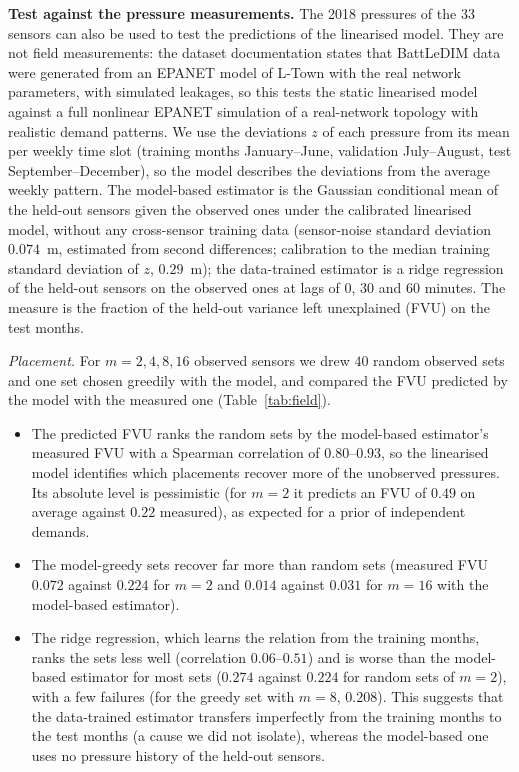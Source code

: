 \documentclass[conference]{IEEEtran}
\begin{document}
\textbf{Test against the pressure measurements.} The 2018 pressures of the 33 sensors can also be used to test the predictions of the linearised model. They are not field measurements: the dataset documentation states that BattLeDIM data were generated from an EPANET model of L-Town with the real network parameters, with simulated leakages, so this tests the static linearised model against a full nonlinear EPANET simulation of a real-network topology with realistic demand patterns. We use the deviations $z$ of each pressure from its mean per weekly time slot (training months January--June, validation July--August, test September--December), so the model describes the deviations from the average weekly pattern. The model-based estimator is the Gaussian conditional mean of the held-out sensors given the observed ones under the calibrated linearised model, without any cross-sensor training data (sensor-noise standard deviation $0.074$~m, estimated from second differences; calibration to the median training standard deviation of $z$, $0.29$~m); the data-trained estimator is a ridge regression of the held-out sensors on the observed ones at lags of $0$, $30$ and $60$ minutes. The measure is the fraction of the held-out variance left unexplained (FVU) on the test months. 

\emph{Placement.} For $m=2,4,8,16$ observed sensors we drew $40$ random observed sets and one set chosen greedily with the model, and compared the FVU predicted by the model with the measured one (Table~\ref{tab:field}).
\begin{itemize}
\item The predicted FVU ranks the random sets by the model-based estimator's measured FVU with a Spearman correlation of $0.80$--$0.93$, so the linearised model identifies which placements recover more of the unobserved pressures. Its absolute level is pessimistic (for $m=2$ it predicts an FVU of $0.49$ on average against $0.22$ measured), as expected for a prior of independent demands.
\item The model-greedy sets recover far more than random sets (measured FVU $0.072$ against $0.224$ for $m=2$ and $0.014$ against $0.031$ for $m=16$ with the model-based estimator).
\item The ridge regression, which learns the relation from the training months, ranks the sets less well (correlation $0.06$--$0.51$) and is worse than the model-based estimator for most sets ($0.274$ against $0.224$ for random sets of $m=2$), with a few failures (for the greedy set with $m=8$, $0.208$). This suggests that the data-trained estimator transfers imperfectly from the training months to the test months (a cause we did not isolate), whereas the model-based one uses no pressure history of the held-out sensors.
\end{itemize}
\end{document}
